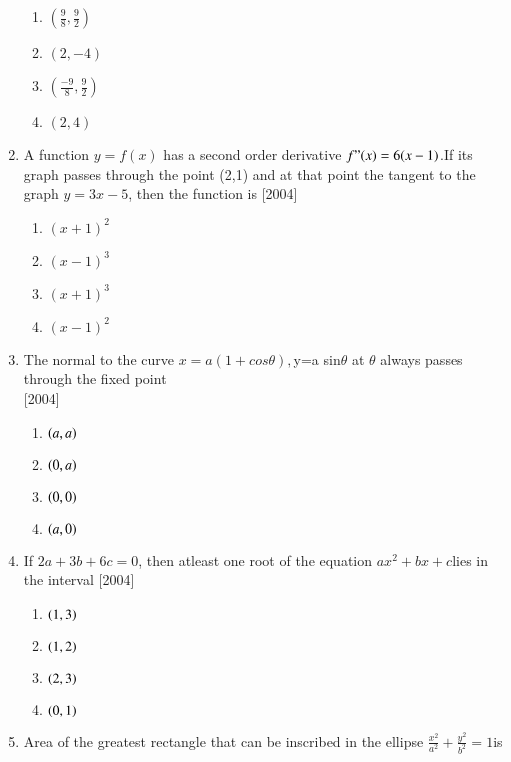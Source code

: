 \documentclass[journal,12pt,twocolumn]{IEEEtran}
\theoremstyle{remark}
\begin{document}
\begin{enumerate}
								\begin{enumerate}
								    \item $(\frac{9}{8},\frac{9}{2})$
								        \item $(2,-4)$
									    \item $(\frac{-9}{8},\frac{9}{2})$
									        \item $(2,4)$
										\end{enumerate}
										\item A function $y=f(x)$ has a second order derivative $f"(x)=6(x-1)$.If its graph passes through the point (2,1) and at that point the tangent to the graph $y=3x-5$, then the function is \hfill{[2004]}
										\begin{enumerate}
										    \item $(x+1)^2$
										        \item $(x-1)^3$
											    \item $(x+1)^3$
											        \item $(x-1)^2$
												\end{enumerate}
												\item The normal to the curve $x=a(1+cos\theta)$$, $y=a sin$\theta$ at $\theta$ always passes through the fixed point\\ \hfill{[2004]}
												\begin{enumerate}
												    \item $\brak{a,a}$
												        \item $\brak{0,a}$
													    \item $\brak{0,0}$
													        \item $\brak{a,0}$
														\end{enumerate}
														\item If $2a+3b+6c=0$, then atleast one root of the equation $ax^2+bx+c$lies in the interval \hfill{[2004]}
														\begin{enumerate}
														    \item $\brak{1,3}$
														        \item $\brak{1,2}$
															    \item $\brak{2,3}$
															        \item $\brak{0,1}$
																\end{enumerate}  
																 \item Area of the greatest rectangle that can be inscribed in the ellipse $\frac{x^2}{a^2}+\frac{y^2}{b^2}=1$is
$$
\end{enumerate}
\end{document}
